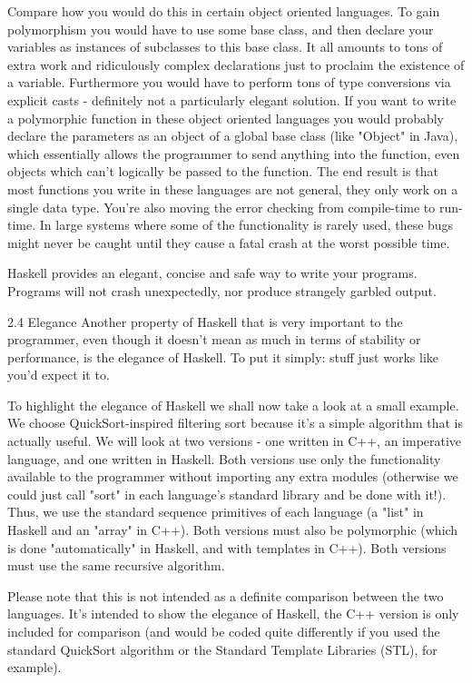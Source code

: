 \documentclass[main.tex]{subfiles}
\begin{document}
{{Compare how you would do this in certain object oriented languages. To gain polymorphism you would have to use some base class, and then declare your variables as instances of subclasses to this base class. It all amounts to tons of extra work and ridiculously complex declarations just to proclaim the existence of a variable. Furthermore you would have to perform tons of type conversions via explicit casts - definitely not a particularly elegant solution. If you want to write a polymorphic function in these object oriented languages you would probably declare the parameters as an object of a global base class (like "Object" in Java), which essentially allows the programmer to send anything into the function, even objects which can't logically be passed to the function. The end result is that most functions you write in these languages are not general, they only work on a single data type. You're also moving the error checking from compile-time to run-time. In large systems where some of the functionality is rarely used, these bugs might never be caught until they cause a fatal crash at the worst possible time.

Haskell provides an elegant, concise and safe way to write your programs. Programs will not crash unexpectedly, nor produce strangely garbled output.

2.4 Elegance
Another property of Haskell that is very important to the programmer, even though it doesn't mean as much in terms of stability or performance, is the elegance of Haskell. To put it simply: stuff just works like you'd expect it to.

To highlight the elegance of Haskell we shall now take a look at a small example. We choose QuickSort-inspired filtering sort because it's a simple algorithm that is actually useful. We will look at two versions - one written in C++, an imperative language, and one written in Haskell. Both versions use only the functionality available to the programmer without importing any extra modules (otherwise we could just call "sort" in each language's standard library and be done with it!). Thus, we use the standard sequence primitives of each language (a "list" in Haskell and an "array" in C++). Both versions must also be polymorphic (which is done "automatically" in Haskell, and with templates in C++). Both versions must use the same recursive algorithm.

Please note that this is not intended as a definite comparison between the two languages. It's intended to show the elegance of Haskell, the C++ version is only included for comparison (and would be coded quite differently if you used the standard QuickSort algorithm or the Standard Template Libraries (STL), for example).

}}
\end{document}
